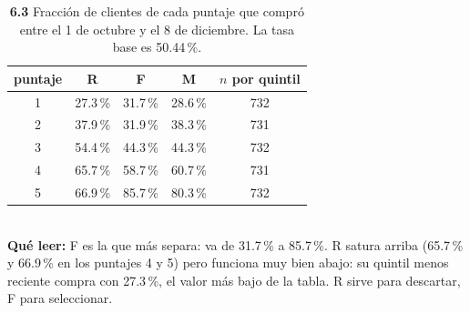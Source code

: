 \begin{table}[htbp]
\centering
\footnotesize
\caption{\textbf{6.3} Fracci\'on de clientes de cada puntaje que compr\'o entre el 1 de octubre y el 8 de diciembre. La tasa base es 50.44\,\%.}
\label{tab:p6_fraccion}
\begin{tabular}{ccccc}
\toprule
\textbf{puntaje} & \textbf{R} & \textbf{F} & \textbf{M} & \textbf{$n$ por quintil} \\
\midrule
1 & 27.3\,\% & 31.7\,\% & 28.6\,\% & 732 \\
2 & 37.9\,\% & 31.9\,\% & 38.3\,\% & 731 \\
3 & 54.4\,\% & 44.3\,\% & 44.3\,\% & 732 \\
4 & 65.7\,\% & 58.7\,\% & 60.7\,\% & 731 \\
5 & 66.9\,\% & 85.7\,\% & 80.3\,\% & 732 \\
\bottomrule
\end{tabular}
\\[0.3em]{\scriptsize \textbf{Qu\'e leer:} F es la que m\'as separa: va de 31.7\,\% a 85.7\,\%. R satura arriba (65.7\,\% y 66.9\,\% en los puntajes 4 y 5) pero funciona muy bien abajo: su quintil menos reciente compra con 27.3\,\%, el valor m\'as bajo de la tabla. R sirve para descartar, F para seleccionar.}
\end{table}
